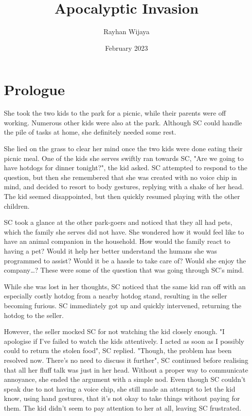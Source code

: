\documentclass{article}
\title{Apocalyptic Invasion}
\author{Rayhan Wijaya}
\date{February 2023}
\begin{document}
\maketitle

\section*{Prologue}

She took the two kids to the park for a picnic, while
their parents were off working. Numerous other kids were
also at the park. Although SC could handle the pile of
tasks at home, she definitely needed some rest.

She lied on the grass to clear her mind once the two kids
were done eating their picnic meal. One of the kids she
serves swiftly ran towards SC, "Are we going to have
hotdogs for dinner tonight?", the kid asked. SC attempted
to respond to the question, but then she remembered that
she was created with no voice chip in mind, and decided
to resort to body gestures, replying with a shake of her
head. The kid seemed disappointed, but then quickly
resumed playing with the other children.

SC took a glance at the other park-goers and noticed that
they all had pets, which the family she serves did not
have. She wondered how it would feel like to have an
animal companion in the household. How would the family
react to having a pet? Would it help her better
understand the humans she was programmed to assist? Would
it be a hassle to take care of? Would she enjoy the
company…? These were some of the question that was going
through SC’s mind.

While she was lost in her thoughts, SC noticed that the
same kid ran off with an especially costly hotdog from a
nearby hotdog stand, resulting in the seller becoming
furious. SC immediately got up and quickly intervened,
returning the hotdog to the seller.

However, the seller mocked SC for not watching the kid
closely enough. "I apologise if I’ve failed to watch the
kids attentively. I acted as soon as I possibly could to
return the stolen food", SC replied. "Though, the problem
has been resolved now. There’s no need to discuss it
further", SC continued before realising that all her
fluff talk was just in her head. Without a proper way to
communicate annoyance, she ended the argument with a
simple nod. Even though SC couldn’t speak due to not having a voice
chip, she still made an attempt to let the kid know,
using hand gestures, that it’s not okay to take things
without paying for them. The kid didn’t seem to pay
attention to her at all, leaving SC frustrated.
\end{document}
